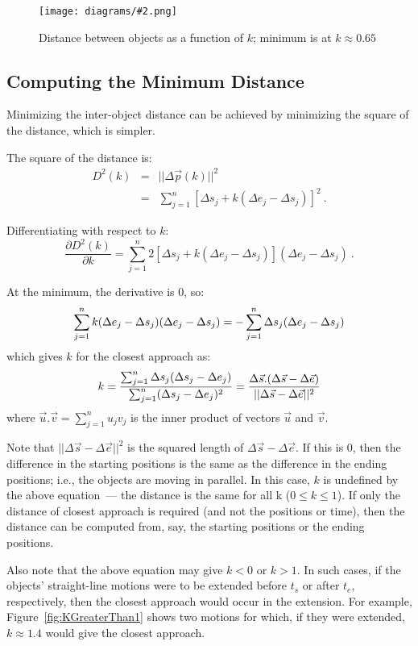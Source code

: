 \documentclass[times,12pt]{article}
\newcommand{\figh}[3][0.4]{
	\begin{figure}[tbp]
		\begin{center}
			\texttt{[image: diagrams/\#2.png]}%
		\end{center}
		\caption{#3}
		\label{fig:#2}
	\end{figure}
}
\begin{document}
\figh[0.6]{Distances}{Distance between objects as a function of $k$; minimum is at $k \approx 0.65$}

\subsection{Computing the Minimum Distance}
Minimizing the inter-object distance can be achieved by minimizing the square of the distance, which is simpler.

The square of the distance is:
\[
\begin{array}{lll}
	D^2(k) & = & ||\Delta{\vec{p}}(k)||^2 \\
	& = & \sum_{j=1}^n [\Delta{s}_j + k(\Delta{e}_j - \Delta{s}_j)]^2 \ .
\end{array}
\]

Differentiating with respect to $k$:
\[
	\frac{\partial D^2(k)}{\partial k} = \sum_{j=1}^n 2[\Delta{s}_j + k(\Delta{e}_j - \Delta{s}_j)](\Delta{e}_j - \Delta{s}_j) \ .
\]

At the minimum, the derivative is 0, so:
\[
	\sum_{j=1}^n k(\Delta{e}_j - \Delta{s}_j)(\Delta{e}_j - \Delta{s}_j)
	= - \sum_{j=1}^n \Delta{s}_j (\Delta{e}_j - \Delta{s}_j) \\
\]
which gives $k$ for the closest approach as:
\[
	k = \frac{\sum_{j=1}^n \Delta{s}_j (\Delta{s}_j - \Delta{e}_j)}
	{\sum_{j=1}^n (\Delta{s}_j - \Delta{e}_j)^2} \\
 	= \frac{\Delta{\vec{s}} . (\Delta{\vec{s}} - \Delta{\vec{e}})}
	{||\Delta{\vec{s}} - \Delta{\vec{e}} ||^2}
\]
where $\vec{u} . \vec{v} = \sum_{j=1}^n u_jv_j$ is the inner product of vectors $\vec{u}$ and $\vec{v}$.
         
Note that $||\Delta{\vec{s}} - \Delta{\vec{e}} ||^2$ is the squared length of $\Delta{\vec{s}} - \Delta{\vec{e}}$. If this is 0, then the difference in the starting positions is the same as the difference in the ending positions; i.e., the objects are moving in parallel. In this case, $k$ is undefined by the above equation~--- the distance is the same for all k ($0 \le k \le 1$). If only the distance of closest approach is required (and not the positions or time), then the distance can be computed from, say, the starting positions or the ending positions.

Also note that the above equation may give $k < 0$ or $k > 1$. In such cases, if the objects' straight-line motions were to be extended before $t_s$ or after $t_e$, respectively, then the closest approach would occur in the extension. For example, Figure~\ref{fig:KGreaterThan1} shows two motions for which, if they were extended, $k \approx 1.4$ would give the closest approach. 
\end{document}
